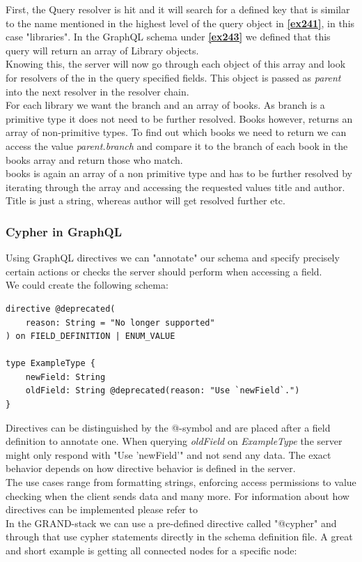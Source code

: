 First, the Query resolver is hit and it will search for a defined key that is similar to the name mentioned in the highest level of the query object in \textbf{\ref{ex241}}, in this case "libraries". In the GraphQL schema under \textbf{\ref{ex243}} we defined that this query will return an array of Library objects. \\
Knowing this, the server will now go through each object of this array and look for resolvers of the in the query specified fields. This object is passed as \emph{parent} into the next resolver in the resolver chain. \\
For each library we want the branch and an array of books. As branch is a primitive type it does not need to be further resolved. Books however, returns an array of non-primitive types. To find out which books we need to return we can access the value \emph{parent.branch} and compare it to the branch of each book in the books array and return those who match. \\
books is again an array of a non primitive type and has to be further resolved by iterating through the array and accessing the requested values title and author. Title is just a string, whereas author will get resolved further etc.

\subsubsection{Cypher in GraphQL}
Using GraphQL directives we can "annotate" our schema and specify precisely certain actions or checks the server should perform when accessing a field. \\
We could create the following schema: 

\begin{lstlisting}[caption={Example Directive Declaration}]
directive @deprecated( 
	reason: String = "No longer supported" 
) on FIELD_DEFINITION | ENUM_VALUE 

type ExampleType { 
	newField: String 
	oldField: String @deprecated(reason: "Use `newField`.")
}
\end{lstlisting}

Directives can be distinguished by the @-symbol and are placed after a field definition to annotate one. When querying \emph{oldField} on \emph{ExampleType} the server might only respond with "Use 'newField'" and not send any data. The exact behavior depends on how directive behavior is defined in the server. \\
The use cases range from formatting strings, enforcing access permissions to value checking when the client sends data and many more. For information about how directives can be implemented please refer to
\\
In the GRAND-stack we can use a pre-defined directive called "@cypher" and through that use cypher statements directly in the schema definition file. A great and short example is getting all connected nodes for a specific node:

